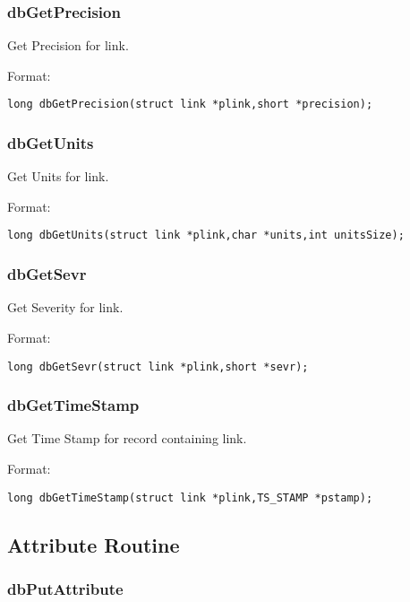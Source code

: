 \subsubsection{dbGetPrecision}

Get Precision for link.

Format:

\begin{verbatim}
long dbGetPrecision(struct link *plink,short *precision);
\end{verbatim}

\subsubsection{dbGetUnits}

Get Units for link.

Format:

\begin{verbatim}
long dbGetUnits(struct link *plink,char *units,int unitsSize);
\end{verbatim}

\subsubsection{dbGetSevr}

Get Severity for link.

Format:

\begin{verbatim}
long dbGetSevr(struct link *plink,short *sevr);
\end{verbatim}

\subsubsection{dbGetTimeStamp}

Get Time Stamp for record containing link.

Format:

\begin{verbatim}
long dbGetTimeStamp(struct link *plink,TS_STAMP *pstamp);
\end{verbatim}

\subsection{Attribute Routine}

\subsubsection{dbPutAttribute}

